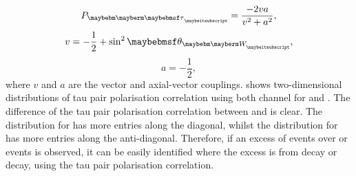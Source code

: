 \begin{equation}
P_{\Ptau} = \frac{-2va}{v^2 + a^2},
\end{equation}
\begin{equation}
v = -\frac{1}{2} + \sin^2{\theta_{\PW}},
\end{equation}
\begin{equation}
a = -\frac{1}{2},
\end{equation}
where $v$ and $a$ are the vector and axial-vector \ZTauTau couplings.  shows two-dimensional distributions of  tau pair polarisation correlation using both \tauToPion channel for \ZToTauTau and \HiggsToTauTau. The difference of the tau pair polarisation correlation between \PZ and \PHiggs  is clear. The distribution for \ZToTauTau has more entries along the diagonal, whilst the distribution for  \HiggsToTauTau has more entries along the anti-diagonal. Therefore, if an excess of \TauTau events over \ee or \MuMu events is observed, it can be easily identified where the excess is from \PHiggs decay or \PZ decay, using the tau pair polarisation correlation.

